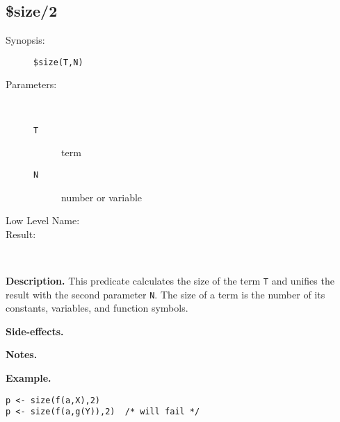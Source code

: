 %
%
%
\subsection{\$size/2}

\begin{description}
\item[Synopsis:]
	{\tt \$size(T,N)}
\item[Parameters:]\ \\[-0.5cm]
	\begin{description}
	\item[{\tt T}] term
	\item[{\tt N}] number or variable
	\end{description}
\item[Low Level Name:]
	{\tt }
\item[Result:]\ \\
\end{description}

\vspace*{0.5cm}
\noindent
{\bf Description.}
This predicate calculates the size of the term {\tt T} and
unifies the result with the second parameter {\tt N}.
The size of a term is the number of its constants, variables, and
function symbols.

\vspace*{0.5cm}
\noindent
{\bf Side-effects.}

\vspace*{0.5cm}
\noindent
{\bf Notes.}

\vspace*{0.5cm}
\noindent
{\bf Example.}
\begin{verbatim}
p <- size(f(a,X),2)
p <- size(f(a,g(Y)),2)  /* will fail */
\end{verbatim}



